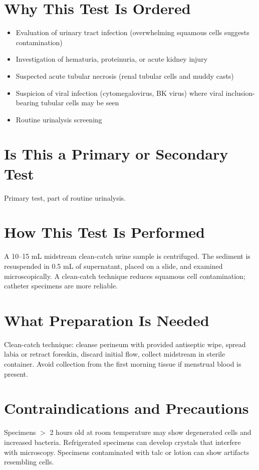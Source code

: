 \section*{Why This Test Is Ordered}
\begin{itemize}
  \item Evaluation of urinary tract infection (overwhelming squamous cells suggests contamination)
  \item Investigation of hematuria, proteinuria, or acute kidney injury
  \item Suspected acute tubular necrosis (renal tubular cells and muddy casts)
  \item Suspicion of viral infection (cytomegalovirus, BK virus) where viral inclusion-bearing tubular cells may be seen
  \item Routine urinalysis screening
\end{itemize}

\section*{Is This a Primary or Secondary Test}
Primary test, part of routine urinalysis.

\section*{How This Test Is Performed}
A 10--15 mL midstream clean-catch urine sample is centrifuged. The sediment is resuspended in 0.5 mL of supernatant, placed on a slide, and examined microscopically. A clean-catch technique reduces squamous cell contamination; catheter specimens are more reliable.

\section*{What Preparation Is Needed}
Clean-catch technique: cleanse perineum with provided antiseptic wipe, spread labia or retract foreskin, discard initial flow, collect midstream in sterile container. Avoid collection from the first morning tissue if menstrual blood is present.

\section*{Contraindications and Precautions}
Specimens $>$ 2 hours old at room temperature may show degenerated cells and increased bacteria. Refrigerated specimens can develop crystals that interfere with microscopy. Specimens contaminated with talc or lotion can show artifacts resembling cells.

